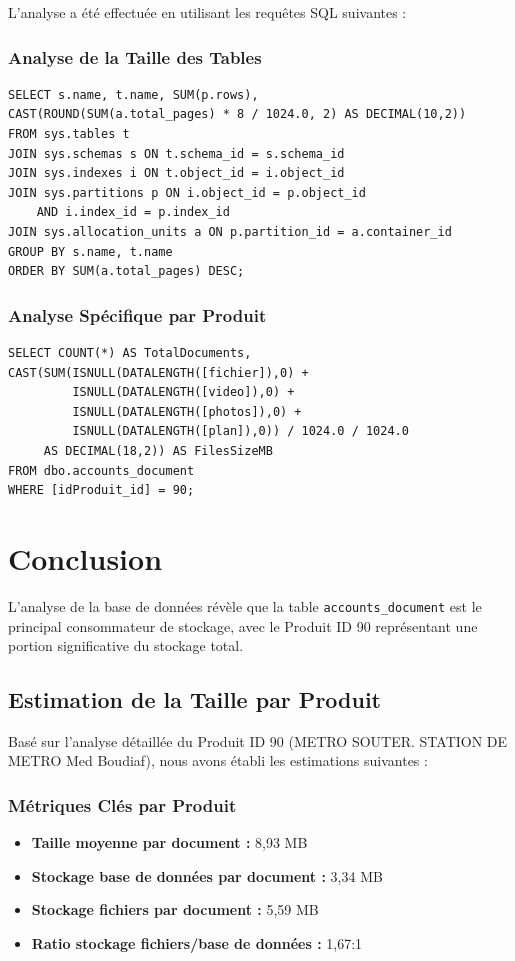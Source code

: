 \documentclass[12pt,a4paper]{article}
\begin{document}
L'analyse a été effectuée en utilisant les requêtes SQL suivantes :

\subsubsection{Analyse de la Taille des Tables}
\begin{verbatim}
SELECT s.name, t.name, SUM(p.rows),
CAST(ROUND(SUM(a.total_pages) * 8 / 1024.0, 2) AS DECIMAL(10,2))
FROM sys.tables t
JOIN sys.schemas s ON t.schema_id = s.schema_id
JOIN sys.indexes i ON t.object_id = i.object_id
JOIN sys.partitions p ON i.object_id = p.object_id 
    AND i.index_id = p.index_id
JOIN sys.allocation_units a ON p.partition_id = a.container_id
GROUP BY s.name, t.name
ORDER BY SUM(a.total_pages) DESC;
\end{verbatim}

\subsubsection{Analyse Spécifique par Produit}
\begin{verbatim}
SELECT COUNT(*) AS TotalDocuments,
CAST(SUM(ISNULL(DATALENGTH([fichier]),0) +
         ISNULL(DATALENGTH([video]),0) +
         ISNULL(DATALENGTH([photos]),0) +
         ISNULL(DATALENGTH([plan]),0)) / 1024.0 / 1024.0
     AS DECIMAL(18,2)) AS FilesSizeMB
FROM dbo.accounts_document
WHERE [idProduit_id] = 90;
\end{verbatim}

\section{Conclusion}

L'analyse de la base de données révèle que la table \texttt{accounts\_document} est le principal consommateur de stockage, avec le Produit ID 90 représentant une portion significative du stockage total.

\subsection{Estimation de la Taille par Produit}

Basé sur l'analyse détaillée du Produit ID 90 (METRO SOUTER. STATION DE METRO Med Boudiaf), nous avons établi les estimations suivantes :

\subsubsection{Métriques Clés par Produit}
\begin{itemize}
    \item \textbf{Taille moyenne par document :} 8,93 MB
    \item \textbf{Stockage base de données par document :} 3,34 MB
    \item \textbf{Stockage fichiers par document :} 5,59 MB
    \item \textbf{Ratio stockage fichiers/base de données :} 1,67:1
\end{itemize}
\end{document}
